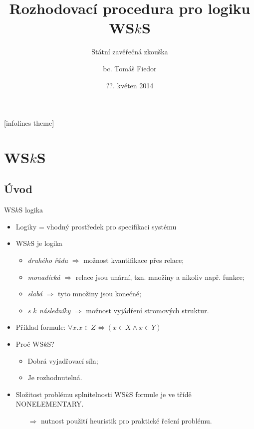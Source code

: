 \documentclass{beamer}
\title[Rozhodovací procedura pro logiku WS$k$S]{Rozhodovací procedura pro logiku
WS$k$S}
\subtitle{Státní zavěřečná zkouška}
\author[T. Fiedor]{bc. Tomáš Fiedor}
\date{??. květen 2014}
\institute[vedoucí: Lengál]{pod vedením Ing. Ondřeje Lengála}
\begin{document}
[infolines theme]

  \begin{frame}[plain]
    \titlepage
  \end{frame}
	
	\section{WS$k$S}
	\subsection{Úvod}
	\begin{frame}{WS$k$S logika}
     \begin{itemize}
       \item Logiky = vhodný prostředek pro specifikaci systému
       \item WS$k$S je logika
       \begin{itemize}
         \pause
         \item \emph{druhého řádu} $\Rightarrow$ možnost kvantifikace přes
         relace;
         \pause
         \item \emph{monadická} $\Rightarrow$ relace jsou unární, tzn. množiny a
         nikoliv např. funkce;
         \pause
         \item \emph{slabá} $\Rightarrow$ tyto množiny jsou konečné;
         \pause
         \item \emph{s $k$ následníky} $\Rightarrow$ možnost vyjádření stromových
         struktur.
         \pause
       \end{itemize}
       \item Příklad formule: $\forall x. x \in Z \Leftrightarrow (x \in X
       \wedge x \in Y)$
       \pause
       \item Proč WS$k$S?
       \pause
       \begin{itemize}
         \item Dobrá vyjadřovací síla;
         \pause
         \item Je rozhodnutelná. 
       \end{itemize}
         \pause
         \item Složitost problému splnitelnosti WS$k$S formule je ve třídě
         NONELEMENTARY.
         \pause
         \begin{itemize}
           \item[$\Rightarrow$] nutnost použití heuristik pro praktické řešení
           problému.
         \end{itemize}
     \end{itemize}
	\end{frame}
	
\end{document}
